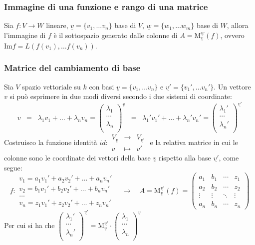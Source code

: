 \documentclass[a4paper]{article}
\newcommand\f[4]{\begin{smallmatrix} {#1} &\to &{#2} \\ {#3} &\mapsto &{#4} \end{smallmatrix}}
\newcommand\m[2]{\text{M}_{\underline{#1}}^{\underline{#2}}}
\newcommand\img{\text{Im}}		%
\begin{document}
\newpage

\subsubsection*{Immagine di una funzione e rango di una matrice}
Sia \(f:V \to W\) lineare, \(\underline{v} = \{v_1, \dots v_n\}\) base di \(V\), \(\underline{w} = \{w_1, \dots w_m\}\) base di \(W\),
allora l'immagine di \(f\) è il sottospazio generato dalle colonne di \(A = \m{v}{w}(f)\), ovvero \(\img f = L(f(v_1), \dots f(v_n))\).

\subsubsection*{Matrice del cambiamento di base}
Sia \(V\) spazio vettoriale su \(k\) con basi \(\underline{v} = \{v_1, \dots v_n\}\) e \(\underline{v'} = \{v_1', \dots v_n'\}\).
Un vettore \(v\) si può esprimere in due modi diversi secondo i due sistemi di coordinate:
\[v \;\; = \;\; \lambda_1 v_1 + \dots + \lambda_n v_n = \begin{pmatrix} \lambda_1 \\ \cdots \\ \lambda_n \\ \end{pmatrix}^{\underline{v}}
	\;\; = \;\;	\lambda_1' v_1' + \dots + \lambda_n' v_n' = \begin{pmatrix} \lambda_1' \\ \cdots \\ \lambda_n' \\ \end{pmatrix}^{\underline{v'}}\]
Costruisco la funzione identità \(id: \f{V_{\underline{v}}}{V_{\underline{v'}}}{v}{v'}\) e la relativa matrice in cui le colonne
sono le coordinate dei vettori della base \(\underline{v}\) rispetto alla base \(\underline{v'}\), come segue:
\[f: \begin{matrix}
	v_1 = a_1 v_1' + a_2 v_2' + \dots + a_n v_n' \\
	v_2 = b_1 v_1' + b_2 v_2' + \dots + b_n v_n' \\
	\dots \\
	v_n = z_1 v_1' + z_2 v_2' + \dots + z_n v_n'
\end{matrix} \quad \longrightarrow \quad A = \m{v}{v'}(f) = \left( \begin{matrix}
	a_1 & b_1 & \cdots & z_1 \\
	a_2 & b_2 & \cdots & z_2 \\
	\vdots & \vdots & \ddots & \vdots \\
	a_n & b_n & \cdots & z_n
\end{matrix} \right)\]
Per cui si ha che \(\begin{pmatrix} \lambda_1' \\ \cdots \\ \lambda_n' \\ \end{pmatrix}^{\underline{v'}} = \m{v}{v'} \cdot \begin{pmatrix} \lambda_1 \\ \cdots \\ \lambda_n \\ \end{pmatrix}^{\underline{v}}\)
\end{document}
